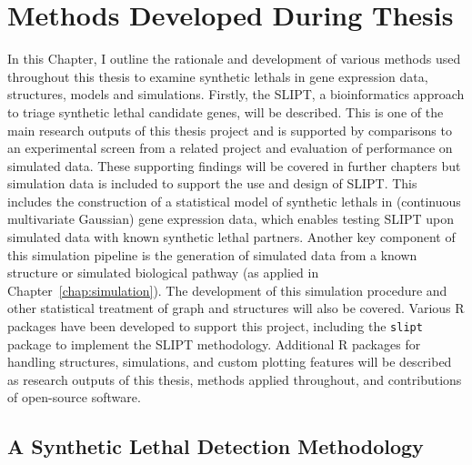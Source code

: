 \chapter{Methods Developed During Thesis}
\label{chap:methods_dev}

In this Chapter, I outline the rationale and development of various methods used throughout this thesis to examine \glspl{synthetic lethal} in \gls{gene expression} data,  structures, models and simulations. Firstly, the \acrfull{SLIPT}, a \gls{bioinformatics} approach to triage \gls{synthetic lethal} candidate genes, will be described. This is one of the main research outputs of this thesis project and is supported by comparisons to an experimental screen from a related project and evaluation of performance on simulated data. These supporting findings will be covered in further chapters but simulation data is included to support the use and design of \gls{SLIPT}. This includes the construction of a statistical model of \glspl{synthetic lethal} in (continuous multivariate Gaussian) \gls{gene expression} data, which enables testing \gls{SLIPT} upon simulated data with known \gls{synthetic lethal} partners. Another key component of this simulation pipeline is the generation of simulated data from a known  structure or simulated biological pathway (as applied in Chapter~\ref{chap:simulation}). The development of this simulation procedure and other statistical treatment of graph and  structures will also be covered. Various R packages have been developed to support this project, including the \texttt{slipt} package to implement the \gls{SLIPT} methodology. Additional R packages for handling  structures, simulations, and custom plotting features will be described as research outputs of this thesis, methods applied throughout, and contributions of open-source software.

\section{A Synthetic Lethal Detection Methodology} \label{methods:SLIPT}

